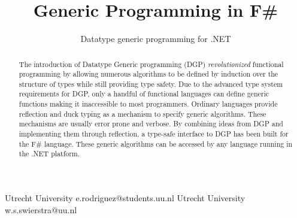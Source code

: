 \documentclass{sigplanconf}
\begin{document}
\setlength{\pdfpageheight}{\paperheight}
\setlength{\pdfpagewidth}{\paperwidth}






\title{Generic Programming in F\#}
\subtitle{Datatype generic programming for .NET}

           {Utrecht University}
           {e.rodriguez@students.uu.nl}
           {Utrecht University}
           {w.s.swierstra@uu.nl}

\newcommand{\Sum}{\mathtt{Sum}}
\newcommand{\Prod}{\mathtt{Prod}}
\newcommand{\Meta}{\mathtt{Meta}}
\newcommand{\K}{\mathtt{K}}
\newcommand{\Id}{\mathtt{Id}}

\maketitle

\begin{abstract}
  The introduction of Datatype Generic programming (DGP)
  \emph{revolutionized} functional programming by allowing numerous
  algorithms to be defined by induction over the structure of types
  while still providing type safety. Due to the advanced type system
  requirements for DGP, only a handful of functional languages can
  define generic functions making it inaccessible to most
  programmers. Ordinary languages provide reflection and duck typing
  as a mechanism to specify generic algorithms. These mechanisms are
  usually error prone and verbose. By combining ideas from DGP and
  implementing them through reflection, a type-safe interface to DGP
  has been built for the F\# language. These generic algorithms can be
  accessed by any language running in the .NET platform.
\end{abstract}
\end{document}
